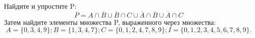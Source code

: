 \question
Найдите и упростите P:
\begin{equation*}
\overline{P} = A \cap \overline{B} \cup \overline{B} \cap C \cup \overline{A} \cap \overline{B} \cup \overline{A} \cap C
\end{equation*}
Затем найдите элементы множества P, выраженного через множества:
\begin{equation*}
A = \{0, 3, 4, 9\}; 
B = \{1, 3, 4, 7\};
C = \{0, 1, 2, 4, 7, 8, 9\};
I = \{0, 1, 2, 3, 4, 5, 6, 7, 8, 9\}.
\end{equation*}